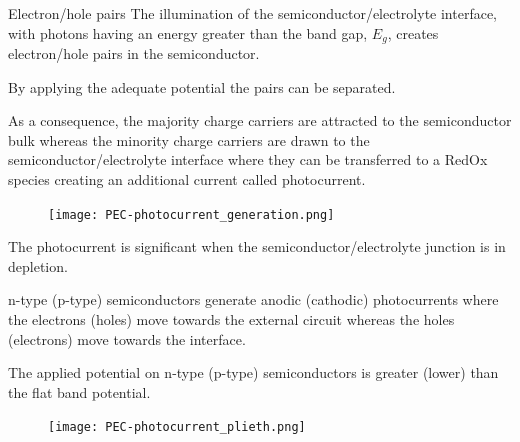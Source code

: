 \documentclass[10pt,compress,handout]{beamer}
\begin{document}
    \begin{frame}[allowframebreaks=1.0]{Electron/hole pairs}
        The illumination of the semiconductor/electrolyte interface, 
        with photons having an energy greater than the band gap, $E_g$, creates 
        electron/hole pairs in the semiconductor. 
        
        By applying the adequate potential the pairs can be separated. 
        
        As a consequence, the majority charge carriers are attracted to the 
        semiconductor bulk whereas the minority charge carriers are drawn to the 
        semiconductor/electrolyte interface where they can be transferred to a RedOx 
        species creating an additional current called photocurrent. 
    
        \begin{figure}[h]
            \centering
            \texttt{[image: PEC-photocurrent\_generation.png]}
            \label{fig_photocurrent_generation}
        \end{figure}
    
        The photocurrent is significant when the semiconductor/electrolyte junction 
        is in depletion. 
        
        n-type (p-type) 
        semiconductors generate anodic (cathodic) photocurrents where the 
        electrons (holes) move towards the external circuit whereas the holes (electrons) 
        move towards the interface. 
        
        The applied potential on n-type (p-type) semiconductors is 
        greater (lower) than the flat band potential. 

        \begin{figure}[h]
            \centering
            \texttt{[image: PEC-photocurrent\_plieth.png]}
            \label{fig_photocurrent_plieth}
        \end{figure}

    \end{frame}
\end{document}
